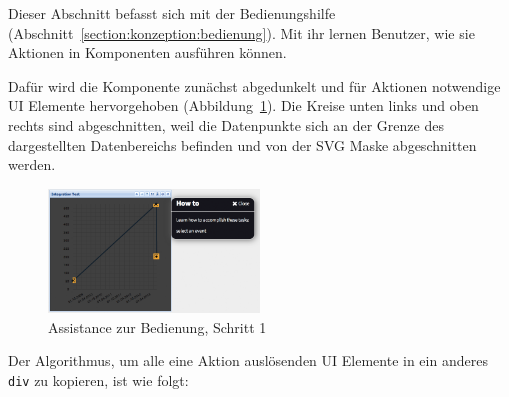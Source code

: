 \documentclass[
	headsepline,
	footsepline,
	fontsize=12pt,
	bibliography=totoc
]{scrbook}
\begin{document}
Dieser Abschnitt befasst sich mit der Bedienungshilfe (Abschnitt~\ref{section:konzeption:bedienung}). Mit ihr lernen Benutzer, wie sie Aktionen in Komponenten ausführen können.

Dafür wird die Komponente zunächst abgedunkelt und für Aktionen notwendige UI Elemente hervorgehoben (Abbildung~\ref{figure:ui-howto-step1}). Die Kreise unten links und oben rechts sind abgeschnitten, weil die Datenpunkte sich an der Grenze des dargestellten Datenbereichs befinden und von der SVG Maske abgeschnitten werden.

\begin{figure}[htbp]
   \centering
   \includegraphics[width=0.5\textwidth]{images/implementierung-ui-howto-step1.png}
   \caption{Assistance zur Bedienung, Schritt 1}
   \label{figure:ui-howto-step1}
\end{figure}

Der Algorithmus, um alle eine Aktion auslösenden UI Elemente in ein anderes \texttt{div} zu kopieren, ist wie folgt: 
\end{document}
